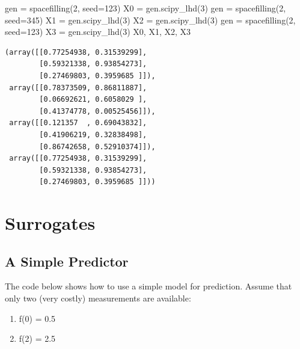 \documentclass[
  letterpaper,
  DIV=11,
  numbers=noendperiod]{scrreprt}
\newenvironment{Shaded}{\begin{snugshade}}{\end{snugshade}}
\newcommand{\DecValTok}[1]{\textcolor[rgb]{0.68,0.00,0.00}{#1}}
\newcommand{\NormalTok}[1]{\textcolor[rgb]{0.00,0.23,0.31}{#1}}
\newcommand{\OperatorTok}[1]{\textcolor[rgb]{0.37,0.37,0.37}{#1}}
\providecommand{\tightlist}{%
  \setlength{\itemsep}{0pt}\setlength{\parskip}{0pt}}\usepackage{longtable,booktabs,array}
\begin{document}
\begin{Shaded}
\begin{Highlighting}[]
\NormalTok{gen }\OperatorTok{=}\NormalTok{ spacefilling(}\DecValTok{2}\NormalTok{, seed}\OperatorTok{=}\DecValTok{123}\NormalTok{)}
\NormalTok{X0 }\OperatorTok{=}\NormalTok{ gen.scipy\_lhd(}\DecValTok{3}\NormalTok{)}
\NormalTok{gen }\OperatorTok{=}\NormalTok{ spacefilling(}\DecValTok{2}\NormalTok{, seed}\OperatorTok{=}\DecValTok{345}\NormalTok{)}
\NormalTok{X1 }\OperatorTok{=}\NormalTok{ gen.scipy\_lhd(}\DecValTok{3}\NormalTok{)}
\NormalTok{X2 }\OperatorTok{=}\NormalTok{ gen.scipy\_lhd(}\DecValTok{3}\NormalTok{)}
\NormalTok{gen }\OperatorTok{=}\NormalTok{ spacefilling(}\DecValTok{2}\NormalTok{, seed}\OperatorTok{=}\DecValTok{123}\NormalTok{)}
\NormalTok{X3 }\OperatorTok{=}\NormalTok{ gen.scipy\_lhd(}\DecValTok{3}\NormalTok{)}
\NormalTok{X0, X1, X2, X3}
\end{Highlighting}
\end{Shaded}

\begin{verbatim}
(array([[0.77254938, 0.31539299],
        [0.59321338, 0.93854273],
        [0.27469803, 0.3959685 ]]),
 array([[0.78373509, 0.86811887],
        [0.06692621, 0.6058029 ],
        [0.41374778, 0.00525456]]),
 array([[0.121357  , 0.69043832],
        [0.41906219, 0.32838498],
        [0.86742658, 0.52910374]]),
 array([[0.77254938, 0.31539299],
        [0.59321338, 0.93854273],
        [0.27469803, 0.3959685 ]]))
\end{verbatim}

\hypertarget{surrogates}{%
\section{Surrogates}\label{surrogates}}

\hypertarget{a-simple-predictor-1}{%
\subsection{A Simple Predictor}\label{a-simple-predictor-1}}

The code below shows how to use a simple model for prediction. Assume
that only two (very costly) measurements are available:

\begin{enumerate}
\def\labelenumi{\arabic{enumi}.}
\tightlist
\item
  f(0) = 0.5
\item
  f(2) = 2.5
\end{enumerate}
\end{document}
